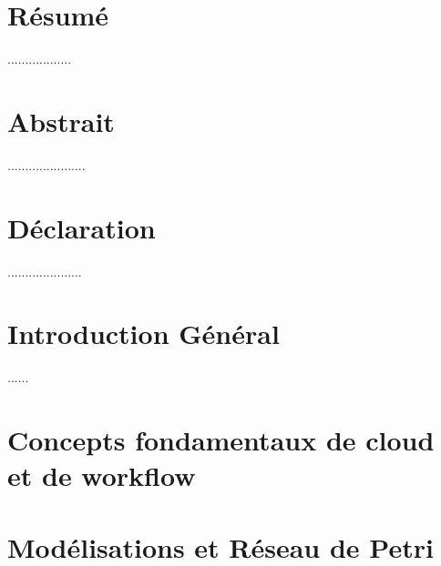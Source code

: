 \documentclass[12pt,twoside]{report}
\author{Zerrouki Djamel}
\theoremstyle{plain}
\theoremstyle{definition}
\theoremstyle{remark}
\begin{document}
 
\chapter*{Résumé}
..................

\chapter*{Abstrait}
......................

\chapter*{Déclaration}
.....................
\chapter*{Introduction Général }
 ......


\tableofcontents
\listoffigures

\listoftables
 
\chapter{Concepts fondamentaux de cloud et de workflow }



\chapter{Modélisations et Réseau de Petri}


%
 
 
 

 \printbibliography
\end{document}
